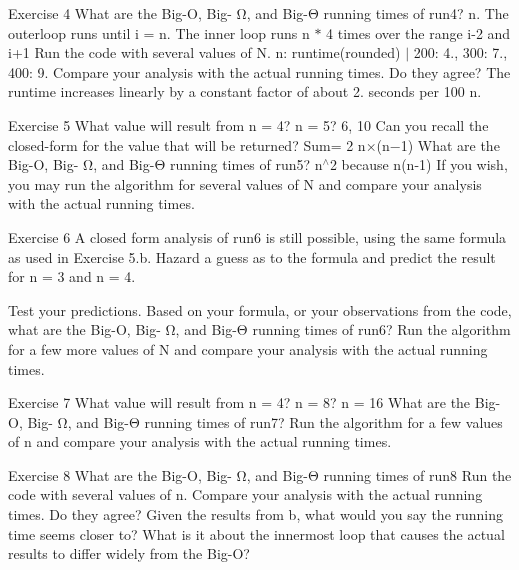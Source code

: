 Exercise 4 What are the Big-\/O, Big-\/ Ω, and Big-\/Θ running times of run4? n. The outerloop runs until i = n. The inner loop runs n \texorpdfstring{$\ast$}{*} 4 times over the range i-\/2 and i+1 Run the code with several values of N. n\+: runtime(rounded) \texorpdfstring{$\vert$}{|} 200\+: 4., 300\+: 7., 400\+: 9. Compare your analysis with the actual running times. Do they agree? The runtime increases linearly by a constant factor of about 2. seconds per 100 n.

Exercise 5 What value will result from n = 4? n = 5? 6, 10 Can you recall the closed-\/form for the value that will be returned? Sum= 2 n×(n−1) What are the Big-\/O, Big-\/ Ω, and Big-\/Θ running times of run5? n\texorpdfstring{$^\wedge$}{\string^}2 because n(n-\/1) If you wish, you may run the algorithm for several values of N and compare your analysis with the actual running times.

Exercise 6 A closed form analysis of run6 is still possible, using the same formula as used in Exercise 5.\+b. Hazard a guess as to the formula and predict the result for n = 3 and n = 4.

Test your predictions. Based on your formula, or your observations from the code, what are the Big-\/O, Big-\/ Ω, and Big-\/Θ running times of run6? Run the algorithm for a few more values of N and compare your analysis with the actual running times.

Exercise 7 What value will result from n = 4? n = 8? n = 16 What are the Big-\/O, Big-\/ Ω, and Big-\/Θ running times of run7? Run the algorithm for a few values of n and compare your analysis with the actual running times.

Exercise 8 What are the Big-\/O, Big-\/ Ω, and Big-\/Θ running times of run8 Run the code with several values of n. Compare your analysis with the actual running times. Do they agree? Given the results from b, what would you say the running time seems closer to? What is it about the innermost loop that causes the actual results to differ widely from the Big-\/O? 